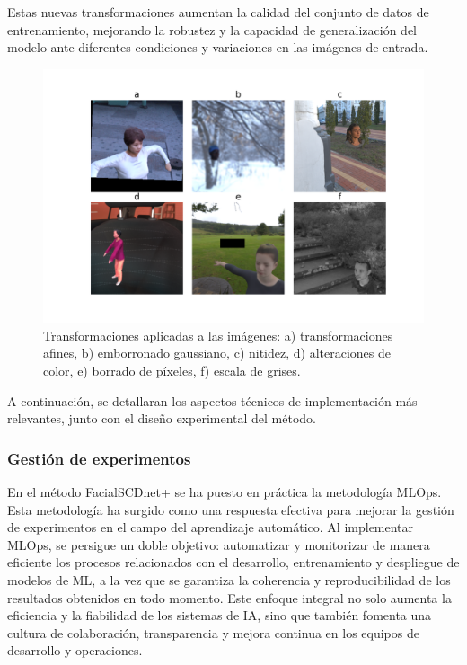 Estas nuevas transformaciones aumentan la calidad del conjunto de datos de entrenamiento, mejorando la robustez y la capacidad de generalización del modelo ante diferentes condiciones y variaciones en las imágenes de entrada.

\begin{figure}[h]
	\centering
	\includegraphics[scale=0.4]{imagenes/cap4/augmented_images.png}
	\caption[Transformaciones utilizadas en el aumento de datos.]{Transformaciones aplicadas a las imágenes: a) transformaciones afines, b) emborronado gaussiano, c) nitidez, d) alteraciones de color, e) borrado de píxeles, f) escala de grises.}
	\label{fig25}
\end{figure}

A continuación, se detallaran los aspectos técnicos de implementación más relevantes, junto con el diseño experimental del método.

\subsubsection{Gestión de experimentos}

En el método FacialSCDnet+ se ha puesto en práctica la metodología MLOps. Esta metodología ha surgido como una respuesta efectiva para mejorar la gestión de experimentos en el campo del aprendizaje automático. Al implementar MLOps, se persigue un doble objetivo: automatizar y monitorizar de manera eficiente los procesos relacionados con el desarrollo, entrenamiento y despliegue de modelos de ML, a la vez que se garantiza la coherencia y reproducibilidad de los resultados obtenidos en todo momento. Este enfoque integral no solo aumenta la eficiencia y la fiabilidad de los sistemas de IA, sino que también fomenta una cultura de colaboración, transparencia y mejora continua en los equipos de desarrollo y operaciones.

